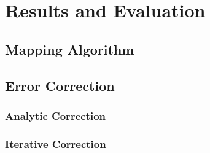 

\chapter{Results and Evaluation}
\section{Mapping Algorithm} %
\label{sec:mapping_algorithm}


\section{Error Correction} %
\label{sec:error_correction}
\subsection{Analytic Correction} %
\label{sub:analytic_correction}


\subsection{Iterative Correction} %
\label{sub:iterative_correction}

